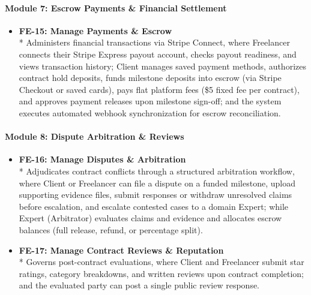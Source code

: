 \paragraph*{Module 7: Escrow Payments \& Financial Settlement}
\begin{itemize}[leftmargin=1.0cm, label=--]

\item \textbf{FE-15: Manage Payments \& Escrow} \\*
Administers financial transactions via Stripe Connect, where Freelancer connects their Stripe Express payout account, checks payout readiness, and views transaction history; Client manages saved payment methods, authorizes contract hold deposits, funds milestone deposits into escrow (via Stripe Checkout or saved cards), pays flat platform fees (\$5 fixed fee per contract), and approves payment releases upon milestone sign-off; and the system executes automated webhook synchronization for escrow reconciliation.

\end{itemize}

\paragraph*{Module 8: Dispute Arbitration \& Reviews}
\begin{itemize}[leftmargin=1.0cm, label=--]

\item \textbf{FE-16: Manage Disputes \& Arbitration} \\*
Adjudicates contract conflicts through a structured arbitration workflow, where Client or Freelancer can file a dispute on a funded milestone, upload supporting evidence files, submit responses or withdraw unresolved claims before escalation, and escalate contested cases to a domain Expert; while Expert (Arbitrator) evaluates claims and evidence and allocates escrow balances (full release, refund, or percentage split).

\item \textbf{FE-17: Manage Contract Reviews \& Reputation} \\*
Governs post-contract evaluations, where Client and Freelancer submit star ratings, category breakdowns, and written reviews upon contract completion; and the evaluated party can post a single public review response.

\end{itemize}

